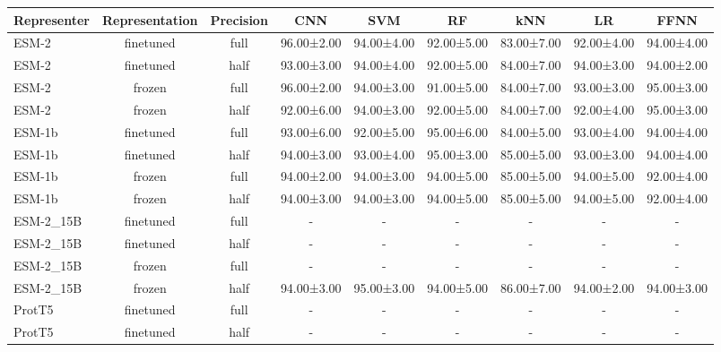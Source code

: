 \begin{tabular}{lcccccccc}
\toprule
 \textbf{Representer} & \textbf{Representation} & \textbf{Precision} &        \textbf{CNN} &        \textbf{SVM} &         \textbf{RF} &        \textbf{kNN} &         \textbf{LR} &       \textbf{FFNN} \\
\midrule
       ESM-2 &      finetuned &      full & 96.00±2.00 & 94.00±4.00 & 92.00±5.00 & 83.00±7.00 & 92.00±4.00 & 94.00±4.00 \\
       ESM-2 &      finetuned &      half & 93.00±3.00 & 94.00±4.00 & 92.00±5.00 & 84.00±7.00 & 94.00±3.00 & 94.00±2.00 \\
       ESM-2 &         frozen &      full & 96.00±2.00 & 94.00±3.00 & 91.00±5.00 & 84.00±7.00 & 93.00±3.00 & 95.00±3.00 \\
       ESM-2 &         frozen &      half & 92.00±6.00 & 94.00±3.00 & 92.00±5.00 & 84.00±7.00 & 92.00±4.00 & 95.00±3.00 \\
      ESM-1b &      finetuned &      full & 93.00±6.00 & 92.00±5.00 & 95.00±6.00 & 84.00±5.00 & 93.00±4.00 & 94.00±4.00 \\
      ESM-1b &      finetuned &      half & 94.00±3.00 & 93.00±4.00 & 95.00±3.00 & 85.00±5.00 & 93.00±3.00 & 94.00±4.00 \\
      ESM-1b &         frozen &      full & 94.00±2.00 & 94.00±3.00 & 94.00±5.00 & 85.00±5.00 & 94.00±5.00 & 92.00±4.00 \\
      ESM-1b &         frozen &      half & 94.00±3.00 & 94.00±3.00 & 94.00±5.00 & 85.00±5.00 & 94.00±5.00 & 92.00±4.00 \\
   ESM-2\_15B &      finetuned &      full &          - &          - &          - &          - &          - &          - \\
   ESM-2\_15B &      finetuned &      half &          - &          - &          - &          - &          - &          - \\
   ESM-2\_15B &         frozen &      full &          - &          - &          - &          - &          - &          - \\
   ESM-2\_15B &         frozen &      half & 94.00±3.00 & 95.00±3.00 & 94.00±5.00 & 86.00±7.00 & 94.00±2.00 & 94.00±3.00 \\
      ProtT5 &      finetuned &      full &          - &          - &          - &          - &          - &          - \\
      ProtT5 &      finetuned &      half &          - &          - &          - &          - &          - &          - \\

\end{tabular}
